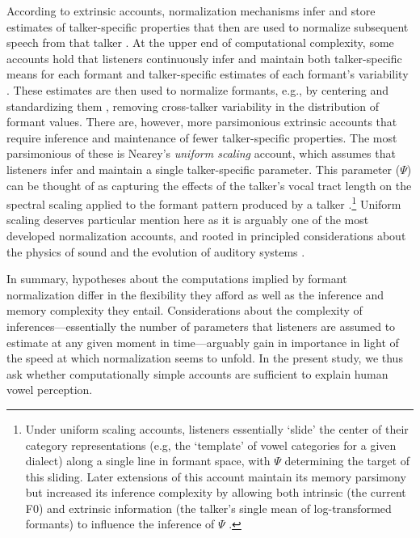 \documentclass[preprint]{JASA}
\begin{document}
According to extrinsic accounts, normalization mechanisms infer and store estimates of talker-specific properties that then are used to normalize subsequent speech from that talker \citetext{\citealp{gerstman1968}; \citealp{lobanov1971}; \citealp{nearey1978}; \citealp{nordstrom-lindblom1975}; \citealp{watt-fabricius2002}; \citealp[for review, see][]{weatherholtz-jaeger2016}}. At the upper end of computational complexity, some accounts hold that listeners continuously infer and maintain both talker-specific means for each formant and talker-specific estimates of each formant's variability \citep{gerstman1968, lobanov1971}. These estimates are then used to normalize formants, e.g., by centering and standardizing them \citep[essentially z-scoring formants,][]{lobanov1971}, removing cross-talker variability in the distribution of formant values. There are, however, more parsimonious extrinsic accounts that require inference and maintenance of fewer talker-specific properties. The most parsimonious of these is Nearey's \emph{uniform scaling} account, which assumes that listeners infer and maintain a single talker-specific parameter. This parameter (\(\Psi\)) can be thought of as capturing the effects of the talker's vocal tract length on the spectral scaling applied to the formant pattern produced by a talker \citep{nearey1978}.\footnote{Under uniform scaling accounts, listeners essentially `slide' the center of their category representations (e.g, the `template' of vowel categories for a given dialect) along a single line in formant space, with \(\Psi\) determining the target of this sliding. Later extensions of this account maintain its memory parsimony but increased its inference complexity by allowing both intrinsic (the current F0) and extrinsic information (the talker's single mean of log-transformed formants) to influence the inference of \(\Psi\) \citep{nearey-assmann2007}.} Uniform scaling deserves particular mention here as it is arguably one of the most developed normalization accounts, and rooted in principled considerations about the physics of sound and the evolution of auditory systems \citep[for review, see][]{barreda2020}.

In summary, hypotheses about the computations implied by formant normalization differ in the flexibility they afford as well as the inference and memory complexity they entail. Considerations about the complexity of inferences---essentially the number of parameters that listeners are assumed to estimate at any given moment in time---arguably gain in importance in light of the speed at which normalization seems to unfold. In the present study, we thus ask whether computationally simple accounts are sufficient to explain human vowel perception.
\end{document}

